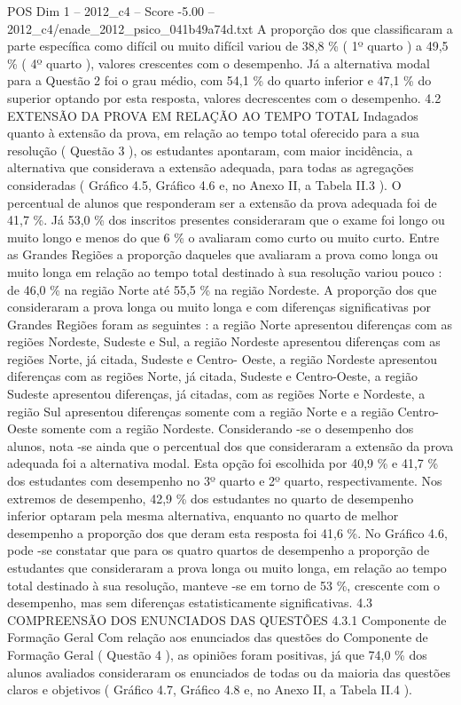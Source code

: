 \begin{textsample}{POS Dim 1 – 2012\_c4 – Score -5.00 – 2012\_c4/enade\_2012\_psico\_041b49a74d.txt}
A proporção dos que classificaram a parte específica como difícil ou muito difícil variou de 38,8 \% ( 1º quarto ) a 49,5 \% ( 4º quarto ), valores crescentes com o desempenho.
Já a alternativa modal para a Questão 2 foi o grau médio, com 54,1 \% do quarto inferior e 47,1 \% do superior optando por esta resposta, valores decrescentes com o desempenho. 4.2 EXTENSÃO DA PROVA EM RELAÇÃO AO TEMPO TOTAL Indagados quanto à extensão da prova, em relação ao tempo total oferecido para a sua resolução ( Questão 3 ), os estudantes apontaram, com maior incidência, a alternativa que considerava a extensão adequada, para todas as agregações consideradas ( Gráfico 4.5, Gráfico 4.6 e, no Anexo II, a Tabela II.3 ).
O percentual de alunos que responderam ser a extensão da prova adequada foi de 41,7 \%.
Já 53,0 \% dos inscritos presentes consideraram que o exame foi longo ou muito longo e menos do que 6 \% o avaliaram como curto ou muito curto.
Entre as Grandes Regiões a proporção daqueles que avaliaram a prova como longa ou muito longa em relação ao tempo total destinado à sua resolução variou pouco : de 46,0 \% na região Norte até 55,5 \% na região Nordeste.
A proporção dos que consideraram a prova longa ou muito longa e com diferenças significativas por Grandes Regiões foram as seguintes : a região Norte apresentou diferenças com as regiões Nordeste, Sudeste e Sul, a região Nordeste apresentou diferenças com as regiões Norte, já citada, Sudeste e Centro- Oeste, a região Nordeste apresentou diferenças com as regiões Norte, já citada, Sudeste e Centro-Oeste, a região Sudeste apresentou diferenças, já citadas, com as regiões Norte e Nordeste, a região Sul apresentou diferenças somente com a região Norte e a região Centro-Oeste somente com a região Nordeste.
Considerando -se o desempenho dos alunos, nota -se ainda que o percentual dos que consideraram a extensão da prova adequada foi a alternativa modal.
Esta opção foi escolhida por 40,9 \% e 41,7 \% dos estudantes com desempenho no 3º quarto e 2º quarto, respectivamente.
Nos extremos de desempenho, 42,9 \% dos estudantes no quarto de desempenho inferior optaram pela mesma alternativa, enquanto no quarto de melhor desempenho a proporção dos que deram esta resposta foi 41,6 \%.
No Gráfico 4.6, pode -se constatar que para os quatro quartos de desempenho a proporção de estudantes que consideraram a prova longa ou muito longa, em relação ao tempo total destinado à sua resolução, manteve -se em torno de 53 \%, crescente com o desempenho, mas sem diferenças estatisticamente significativas. 4.3 COMPREENSÃO DOS ENUNCIADOS DAS QUESTÕES 4.3.1 Componente de Formação Geral Com relação aos enunciados das questões do Componente de Formação Geral ( Questão 4 ), as opiniões foram positivas, já que 74,0 \% dos alunos avaliados consideraram os enunciados de todas ou da maioria das questões claros e objetivos ( Gráfico 4.7, Gráfico 4.8 e, no Anexo II, a Tabela II.4 ).

\end{textsample}
